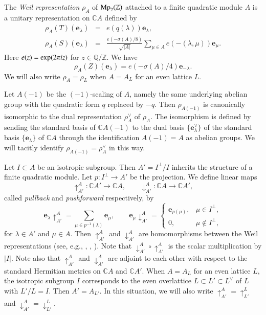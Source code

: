 \documentclass[12pt]{amsart}
\numberwithin{equation}{section}
\theoremstyle{definition}
\theoremstyle{remark}
\newcommand{\Z}{\mathbb{Z}}
\newcommand{\Q}{\mathbb{Q}}
\newcommand{\C}{\mathbb{C}}
\newcommand{\emu}{{\mathbf e}_{\mu}}
\newcommand{\elambda}{{\mathbf e}_{\lambda}}
\newcommand{\Mp}{{\rm Mp}_2(\mathbb{Z})}
\begin{document}
The \textit{Weil representation} $\rho_A$ of ${\Mp}$ attached to a finite quadratic module $A$ 
is a unitary representation on ${\C}A$ defined by 
\begin{eqnarray*}
\rho_A(T)({\elambda}) & = & e(q(\lambda)){\elambda}, \\ 
\rho_A(S)({\elambda}) & = & 
\frac{e(-\sigma(A)/8)}{\sqrt{|A|}} \sum_{\mu\in A}e(-(\lambda, \mu)){\emu}.  
\end{eqnarray*}
Here $e(z)={\rm exp}(2\pi i z)$ for $z\in{\Q}/{\Z}$. 
We have 
\begin{equation*}
\rho_A(Z)({\elambda})  = e(-\sigma(A)/4)\mathbf{e}_{-\lambda}. 
\end{equation*}
We will also write $\rho_A=\rho_L$ when $A=A_{L}$ for an even lattice $L$. 

 
Let $A(-1)$ be the $(-1)$-scaling of $A$, 
namely the same underlying abelian group with the quadratic form $q$ replaced by $-q$. 
Then $\rho_{A(-1)}$ is canonically isomorphic to the dual representation $\rho_A^{\vee}$ of $\rho_A$. 
The isomorphism is defined by sending the standard basis of ${\C}A(-1)$ 
to the dual basis $\{ \mathbf{e}_{\lambda}^{\vee} \}$ 
of the standard basis $\{ \mathbf{e}_{\lambda} \}$ of ${\C}A$ 
through the identification $A(-1)=A$ as abelian groups. 
We will tacitly identify $\rho_{A(-1)}=\rho_{A}^{\vee}$ in this way. 
 
Let $I\subset A$ be an isotropic subgroup. 
Then $A'=I^{\perp}/I$ inherits the structure of a finite quadratic module. 
Let $p:I^{\perp}\to A'$ be the projection. 
We define linear maps 
\begin{equation}\label{eqn: pull push}
\uparrow_{A'}^{A} : {\C}A' \to {\C}A, \qquad 
\downarrow_{A'}^{A} : {\C}A \to {\C}A', 
\end{equation}
called \textit{pullback} and \textit{pushforward} respectively, by 
\begin{equation*}
{\elambda}\uparrow_{A'}^{A}=\sum_{\mu\in p^{-1}(\lambda)}{\emu}, \qquad 
{\emu}\downarrow_{A'}^{A} = 
\begin{cases}
\mathbf{e}_{p(\mu)}, & \mu\in I^{\perp}, \\ 
0, & \mu\not\in I^{\perp},  
\end{cases}
\end{equation*}
for $\lambda\in A'$ and $\mu\in A$. 
Then 
$\uparrow_{A'}^{A}$ and $\downarrow_{A'}^{A}$ are homomorphisms between the Weil representations 
(see, e.g., \cite{Bo98}, \cite{Br}, \cite{Ma}). 
Note that 
$\downarrow^{A}_{A'}\circ \uparrow^{A}_{A'}$ 
is the scalar multiplication by $|I|$. 
Note also that 
$\uparrow_{A'}^{A}$ and $\downarrow_{A'}^{A}$ 
are adjoint to each other with respect to the standard Hermitian metrics on ${\C}A$ and ${\C}A'$. 
When $A=A_{L}$ for an even lattice $L$, 
the isotropic subgroup $I$ corresponds to 
the even overlattice $L\subset L'\subset L^{\vee}$ of $L$ with $L'/L=I$. 
Then $A'=A_{L'}$. 
In this situation, we will also write 
$\uparrow_{A'}^{A} = \uparrow_{L'}^{L}$ and 
$\downarrow_{A'}^{A}=\downarrow_{L'}^{L}$.  
\end{document}
